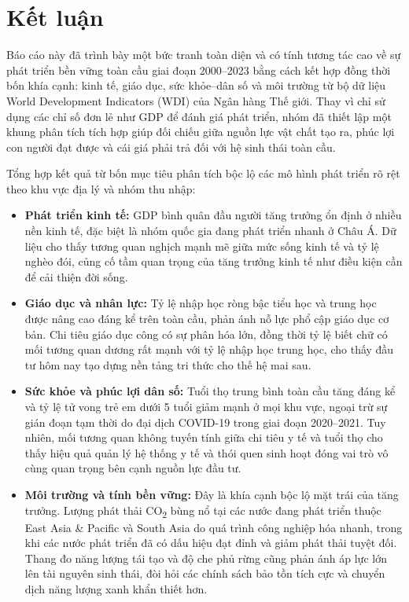 \section{Kết luận}

Báo cáo này đã trình bày một bức tranh toàn diện và có tính tương tác cao về sự phát triển bền vững toàn cầu giai đoạn 2000--2023 bằng cách kết hợp đồng thời bốn khía cạnh: kinh tế, giáo dục, sức khỏe--dân số và môi trường từ bộ dữ liệu World Development Indicators (WDI) của Ngân hàng Thế giới. Thay vì chỉ sử dụng các chỉ số đơn lẻ như GDP để đánh giá phát triển, nhóm đã thiết lập một khung phân tích tích hợp giúp đối chiếu giữa nguồn lực vật chất tạo ra, phúc lợi con người đạt được và cái giá phải trả đối với hệ sinh thái toàn cầu.

Tổng hợp kết quả từ bốn mục tiêu phân tích bộc lộ các mô hình phát triển rõ rệt theo khu vực địa lý và nhóm thu nhập:
\begin{itemize}
    \item \textbf{Phát triển kinh tế:} GDP bình quân đầu người tăng trưởng ổn định ở nhiều nền kinh tế, đặc biệt là nhóm quốc gia đang phát triển nhanh ở Châu Á. Dữ liệu cho thấy tương quan nghịch mạnh mẽ giữa mức sống kinh tế và tỷ lệ nghèo đói, củng cố tầm quan trọng của tăng trưởng kinh tế như điều kiện cần để cải thiện đời sống.
    \item \textbf{Giáo dục và nhân lực:} Tỷ lệ nhập học ròng bậc tiểu học và trung học được nâng cao đáng kể trên toàn cầu, phản ánh nỗ lực phổ cập giáo dục cơ bản. Chi tiêu giáo dục công có sự phân hóa lớn, đồng thời tỷ lệ biết chữ có mối tương quan dương rất mạnh với tỷ lệ nhập học trung học, cho thấy đầu tư hôm nay tạo dựng nền tảng tri thức cho thế hệ mai sau.
    \item \textbf{Sức khỏe và phúc lợi dân số:} Tuổi thọ trung bình toàn cầu tăng đáng kể và tỷ lệ tử vong trẻ em dưới 5 tuổi giảm mạnh ở mọi khu vực, ngoại trừ sự gián đoạn tạm thời do đại dịch COVID-19 trong giai đoạn 2020--2021. Tuy nhiên, mối tương quan không tuyến tính giữa chi tiêu y tế và tuổi thọ cho thấy hiệu quả quản lý hệ thống y tế và thói quen sinh hoạt đóng vai trò vô cùng quan trọng bên cạnh nguồn lực đầu tư.
    \item \textbf{Môi trường và tính bền vững:} Đây là khía cạnh bộc lộ mặt trái của tăng trưởng. Lượng phát thải CO\textsubscript{2} bùng nổ tại các nước đang phát triển thuộc East Asia \& Pacific và South Asia do quá trình công nghiệp hóa nhanh, trong khi các nước phát triển đã có dấu hiệu đạt đỉnh và giảm phát thải tuyệt đối. Thang đo năng lượng tái tạo và độ che phủ rừng cũng phản ánh áp lực lớn lên tài nguyên sinh thái, đòi hỏi các chính sách bảo tồn tích cực và chuyển dịch năng lượng xanh khẩn thiết hơn.
\end{itemize}

